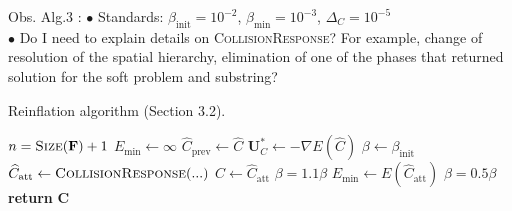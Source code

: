 \noindent Obs. Alg.3 : $\bullet$ Standards: $\beta_{\mathrm{init}} = 10^{-2}$, $\beta_{\mathrm{min}} = 10^{-3}$,
$\Delta_C = 10^{-5}$ \\
$\bullet$ Do I need to explain details on \textsc{CollisionResponse}? For example, change of resolution of
the spatial hierarchy, elimination of one of the phases that returned solution for the soft problem and substring?

\begin{algorithm}
   \caption{Reinflation algorithm (Section 3.2).}
   \label{alg:ReInflation}
   \begin{algorithmic}[1]
      \State $n = \textsc{Size}(\textbf{F})+1$
      \State $E_{\mathrm{min}} \gets \infty$
      \State $\widehat{C}_{\mathrm{prev}} \gets \widehat{C}$
      \State $\mathbf{U}_C^* \gets -\nabla E (\widehat{C}) $ 
      \State $\beta \gets \beta_{\mathrm{init}}$
      \State $\widehat{C}_\mathrm{att} \gets \textsc{CollisionResponse}(...)$
      \State $\widehat{C} \gets \widehat{C}_{\mathrm{att}}$
      \State $\beta = 1.1 \beta$
      \State $E_{\mathrm{min}} \gets E(\widehat{C}_{\mathrm{att}})$
      \Else
      \State $\beta = 0.5 \beta$
      \EndIf
      \EndWhile
      \EndWhile
      \EndFor
      \State \textbf{return} $\mathbf{C}$
      \EndProcedure
   \end{algorithmic}
\end{algorithm}